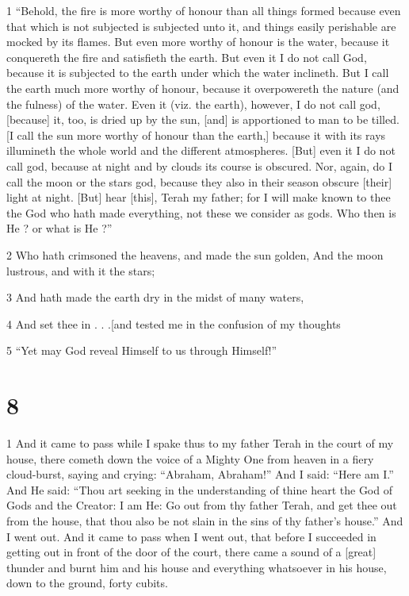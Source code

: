 \par 1 “Behold, the fire is more worthy of honour than all things formed because even that which is not subjected is subjected unto it, and things easily perishable are mocked by its flames. But even more worthy of honour is the water, because it conquereth the fire and satisfieth the earth. But even it I do not call God, because it is subjected to the earth under which the water inclineth. But I call the earth much more worthy of honour, because it overpowereth the nature (and the fulness) of the water. Even it (viz. the earth), however, I do not call god, [because] it, too, is dried up by the sun, [and] is apportioned to man to be tilled. [I call the sun more worthy of honour than the earth,] because it with its rays illumineth the whole world and the different atmospheres. [But] even it I do not call god, because at night and by clouds its course is obscured. Nor, again, do I call the moon or the stars god, because they also in their season obscure [their] light at night. [But] hear [this], Terah my father; for I will make known to thee the God who hath made everything, not these we consider as gods. Who then is He ? or what is He ?”

\par 2 Who hath crimsoned the heavens, and made the sun golden, And the moon lustrous, and with it the stars;

\par 3 And hath made the earth dry in the midst of many waters,

\par 4 And set thee in . . .[and tested me in the confusion of my thoughts

\par 5 “Yet may God reveal Himself to us through Himself!”

\chapter{8}

\par 1 And it came to pass while I spake thus to my father Terah in the court of my house, there cometh down the voice of a Mighty One from heaven in a fiery cloud-burst, saying and crying: “Abraham, Abraham!” And I said: “Here am I.” And He said: “Thou art seeking in the understanding of thine heart the God of Gods and the Creator: I am He: Go out from thy father Terah, and get thee out from the house, that thou also be not slain in the sins of thy father's house.” And I went out. And it came to pass when I went out, that before I succeeded in getting out in front of the door of the court, there came a sound of a [great] thunder and burnt him and his house and everything whatsoever in his house, down to the ground, forty cubits. 

